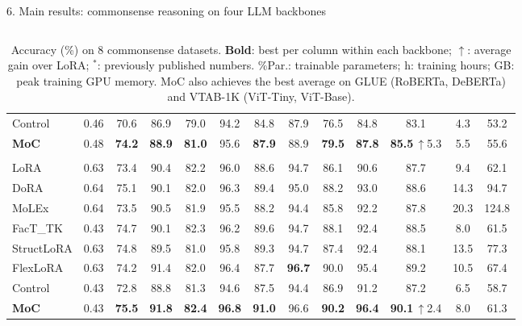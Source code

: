 \documentclass[final]{beamer}
\newlength{\widewidth}
\newcommand{\up}[1]{\,{\color{mocup}\scriptsize$\uparrow$#1}}
\begin{document}
\begin{frame}[t]
\begin{columns}[t]
\begin{column}{\widewidth}
\begin{block}{6. Main results: commonsense reasoning on four LLM backbones}
\begin{table}
\begin{columns}[t,totalwidth=\linewidth]
\begin{column}{0.495\linewidth}
\begin{tabular}{@{}l c cccccccc >{\columncolor{neuripsrule!30}}c cc@{}}
            Control & 0.46 & 70.6 & 86.9 & 79.0 & 94.2 & 84.8 & 87.9 & 76.5 & 84.8 & 83.1 & 4.3 & 53.2 \\
            \rowcolor{mocrow}\textbf{MoC} & 0.48 & \textbf{74.2} & \textbf{88.9} & \textbf{81.0} & 95.6 & \textbf{87.9} & 88.9 & \textbf{79.5} & \textbf{87.8} & \textbf{85.5}\up{5.3} & 5.5 & 55.6 \\
            \midrule
            \rowcolor{grouprow}\multicolumn{13}{l}{\textbf{Qwen2.5-14B}} \\
            LoRA & 0.63 & 73.4 & 90.4 & 82.2 & 96.0 & 88.6 & 94.7 & 86.1 & 90.6 & 87.7 & 9.4 & 62.1 \\
            DoRA & 0.64 & 75.1 & 90.1 & 82.0 & 96.3 & 89.4 & 95.0 & 88.2 & 93.0 & 88.6 & 14.3 & 94.7 \\
            MoLEx & 0.64 & 73.5 & 90.5 & 81.9 & 95.5 & 88.2 & 94.4 & 85.8 & 92.2 & 87.8 & 20.3 & 124.8 \\
            FacT\_TK & 0.43 & 74.7 & 90.1 & 82.3 & 96.2 & 89.6 & 94.7 & 88.1 & 92.4 & 88.5 & 8.0 & 61.5 \\
            StructLoRA & 0.63 & 74.8 & 89.5 & 81.0 & 95.8 & 89.3 & 94.7 & 87.4 & 92.4 & 88.1 & 13.5 & 77.3 \\
            FlexLoRA & 0.63 & 74.2 & 91.4 & 82.0 & 96.4 & 87.7 & \textbf{96.7} & 90.0 & 95.4 & 89.2 & 10.5 & 67.4 \\
            Control & 0.43 & 72.8 & 88.8 & 81.3 & 94.6 & 87.5 & 94.4 & 86.9 & 91.2 & 87.2 & 6.5 & 58.7 \\
            \rowcolor{mocrow}\textbf{MoC} & 0.43 & \textbf{75.5} & \textbf{91.8} & \textbf{82.4} & \textbf{96.8} & \textbf{91.0} & 96.6 & \textbf{90.2} & \textbf{96.4} & \textbf{90.1}\up{2.4} & 8.0 & 61.3 \\
            \bottomrule
          \end{tabular}
        \end{column}
      \end{columns}
      \caption{Accuracy (\%) on 8 commonsense datasets. \textbf{Bold}: best per
        column within each backbone; {\color{mocup}$\uparrow$}: average gain over
        LoRA; $^{*}$: previously published numbers. \%Par.: trainable parameters;
        h: training hours; GB: peak training GPU memory. MoC also achieves the
        best average on GLUE (RoBERTa, DeBERTa) and VTAB-1K (ViT-Tiny, ViT-Base).}
    \end{table}

  \end{block}


\end{column}
\end{columns}
\end{frame}
\end{document}
